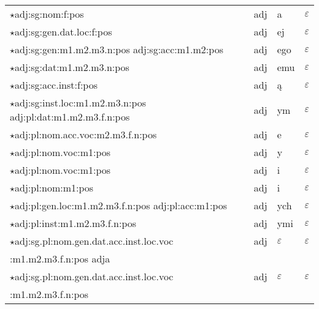 \documentclass{article}
\begin{document}
\begin{longtable}{p{7cm}|l|l|l}
$\star$adj:sg:nom:f:pos & adj & a & $\varepsilon$\\
$\star$adj:sg:gen.dat.loc:f:pos & adj & ej & $\varepsilon$\\
$\star$adj:sg:gen:m1.m2.m3.n:pos adj:sg:acc:m1.m2:pos & adj & ego & $\varepsilon$\\
$\star$adj:sg:dat:m1.m2.m3.n:pos & adj & emu & $\varepsilon$\\
$\star$adj:sg:acc.inst:f:pos & adj & ą & $\varepsilon$\\
$\star$adj:sg:inst.loc:m1.m2.m3.n:pos adj:pl:dat:m1.m2.m3.f.n:pos & adj & ym & $\varepsilon$\\
$\star$adj:pl:nom.acc.voc:m2.m3.f.n:pos & adj & e & $\varepsilon$\\
$\star$adj:pl:nom.voc:m1:pos & adj & y & $\varepsilon$\\
$\star$adj:pl:nom.voc:m1:pos & adj & i & $\varepsilon$\\
$\star$adj:pl:nom:m1:pos & adj & i & $\varepsilon$\\
$\star$adj:pl:gen.loc:m1.m2.m3.f.n:pos adj:pl:acc:m1:pos & adj & ych & $\varepsilon$\\
$\star$adj:pl:inst:m1.m2.m3.f.n:pos & adj & ymi & $\varepsilon$\\
$\star$adj:sg.pl:nom.gen.dat.acc.inst.loc.voc & adj & $\varepsilon$ & $\varepsilon$ \\
	\quad \quad :m1.m2.m3.f.n:pos adja & & & \\
$\star$adj:sg.pl:nom.gen.dat.acc.inst.loc.voc & adj & $\varepsilon$ & $\varepsilon$\\
	\quad \quad :m1.m2.m3.f.n:pos & & & \\
\end{longtable}
\end{document}
